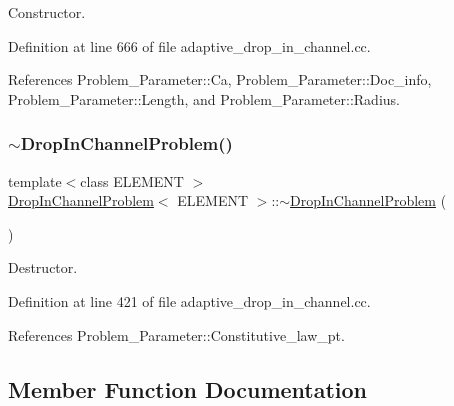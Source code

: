 Constructor. 



Definition at line 666 of file adaptive\+\_\+drop\+\_\+in\+\_\+channel.\+cc.



References Problem\+\_\+\+Parameter\+::\+Ca, Problem\+\_\+\+Parameter\+::\+Doc\+\_\+info, Problem\+\_\+\+Parameter\+::\+Length, and Problem\+\_\+\+Parameter\+::\+Radius.

\mbox{\label{classDropInChannelProblem_aa311cd8061b915901c8c74617d2e4a37}} 
\subsubsection{\texorpdfstring{$\sim$\+Drop\+In\+Channel\+Problem()}{~DropInChannelProblem()}}
{\footnotesize\ttfamily template$<$class E\+L\+E\+M\+E\+NT $>$ \\
\hyperlink{classDropInChannelProblem}{Drop\+In\+Channel\+Problem}$<$ E\+L\+E\+M\+E\+NT $>$\+::$\sim$\hyperlink{classDropInChannelProblem}{Drop\+In\+Channel\+Problem} (\begin{DoxyParamCaption}{ }\end{DoxyParamCaption})\hspace{0.3cm}{\ttfamily [inline]}}



Destructor. 



Definition at line 421 of file adaptive\+\_\+drop\+\_\+in\+\_\+channel.\+cc.



References Problem\+\_\+\+Parameter\+::\+Constitutive\+\_\+law\+\_\+pt.



\subsection{Member Function Documentation}
\mbox{\label{classDropInChannelProblem_af5cc96bc60c2fd2386d16eac3ee5f83a}} 

